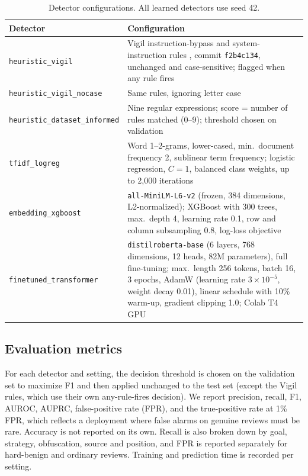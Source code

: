 \documentclass[11pt,a4paper]{article}
\newcommand{\code}[1]{\texttt{#1}}
\begin{document}
\begin{table}[h]
\centering
\caption{Detector configurations. All learned detectors use seed 42.}
\label{tab:detectors}
\begin{tabularx}{\textwidth}{lL}
\toprule
Detector & Configuration \\
\midrule
\code{heuristic\_vigil} & Vigil instruction-bypass and system-instruction rules \citep{vigil}, commit \code{f2b4c134}, unchanged and case-sensitive; flagged when any rule fires \\
\code{heuristic\_vigil\_nocase} & Same rules, ignoring letter case \\
\code{heuristic\_dataset\_informed} & Nine regular expressions; score = number of rules matched (0--9); threshold chosen on validation \\
\code{tfidf\_logreg} & Word 1--2-grams, lower-cased, min.\ document frequency 2, sublinear term frequency; logistic regression, $C=1$, balanced class weights, up to 2,000 iterations \\
\code{embedding\_xgboost} & \code{all-MiniLM-L6-v2} (frozen, 384 dimensions, L2-normalized); XGBoost with 300 trees, max.\ depth 4, learning rate 0.1, row and column subsampling 0.8, log-loss objective \\
\code{finetuned\_transformer} & \code{distilroberta-base} \citep{distilroberta_card} (6 layers, 768 dimensions, 12 heads, 82M parameters), full fine-tuning; max.\ length 256 tokens, batch 16, 3 epochs, AdamW (learning rate $3\times10^{-5}$, weight decay 0.01), linear schedule with 10\% warm-up, gradient clipping 1.0; Colab T4 GPU \\
\bottomrule
\end{tabularx}
\end{table}

\subsection{Evaluation metrics}

For each detector and setting, the decision threshold is chosen on the validation set to maximize F1 and then applied unchanged to the test set (except the Vigil rules, which use their own any-rule-fires decision). We report precision, recall, F1, AUROC, AUPRC, false-positive rate (FPR), and the true-positive rate at 1\% FPR, which reflects a deployment where false alarms on genuine reviews must be rare. Accuracy is not reported on its own. Recall is also broken down by goal, strategy, obfuscation, source and position, and FPR is reported separately for hard-benign and ordinary reviews. Training and prediction time is recorded per setting.
\end{document}
